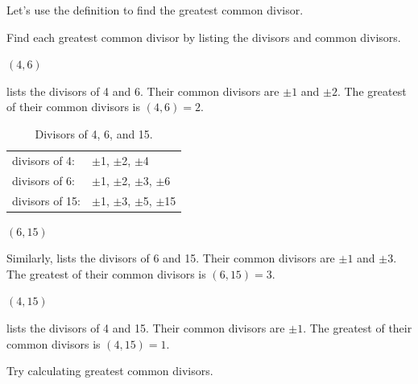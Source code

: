 Let's use the definition to find the greatest common divisor.

\begin{exam}
\label{exam_gcd_list_div}
    Find each greatest common divisor by listing the divisors and common divisors.
        \begin{apart}
            \item {}$(4,6)$
                \begin{soln}
                     lists the divisors of 4 and 6.  Their common divisors are $\pm 1$ and $\pm 2$. The greatest of their common divisors is $(4,6)= 2$.
                \end{soln}

        \begin{table}[htbp]
            \centering
            \begin{tabular}{ll}
            divisors of 4: & $\pm$1, $\pm$2, $\pm$4 \\
            divisors of 6: & $\pm$1, $\pm$2, $\pm$3, $\pm$6 \\
            divisors of 15: &$\pm$1, $\pm$3, $\pm$5, $\pm$15
            \end{tabular}
            \caption{Divisors of 4, 6, and 15.}
            \label{table_divisors4615}
        \end{table}
        
            \item {}$(6,15)$
                \begin{soln}
                    Similarly,  lists the divisors of 6 and 15.  Their common divisors are $\pm 1$ and $\pm 3$. The greatest of their common divisors is $(6,15)=3$.
                \end{soln}
            \item {}$(4,15)$
                \begin{soln}
                     lists the divisors of 4 and 15.  Their common divisors are $\pm 1$. The greatest of their common divisors is $(4,15)=1$.
                \end{soln}
        \end{apart}
\end{exam}

Try calculating greatest common divisors.

